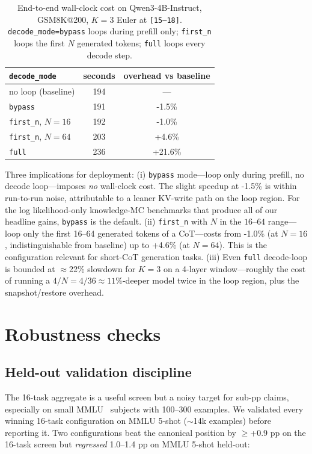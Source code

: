 \begin{table}[h]
\centering
\footnotesize
\caption{End-to-end wall-clock cost on Qwen3-4B-Instruct, GSM8K@200,
$K{=}3$ Euler at \texttt{[15--18]}. \texttt{decode\_mode=bypass} loops
during prefill only; \texttt{first\_n} loops the first $N$ generated
tokens; \texttt{full} loops every decode step.}
\label{tab:wallclock}
\setlength{\tabcolsep}{8pt}
\begin{tabular}{lcc}
\toprule
\texttt{decode\_mode} & seconds & overhead vs baseline \\
\midrule
no loop (baseline)        & 194 & ---       \\
\texttt{bypass}           & 191 & -1.5\% \\
\texttt{first\_n}, $N{=}16$ & 192 & -1.0\% \\
\texttt{first\_n}, $N{=}64$ & 203 & +4.6\% \\
\texttt{full}             & 236 & +21.6\% \\
\bottomrule
\end{tabular}
\end{table}

Three implications for deployment: (i) \texttt{bypass} mode---loop only during prefill, no decode loop---imposes \emph{no} wall-clock cost. The slight speedup at -1.5\% is within run-to-run noise, attributable to a leaner KV-write path on the loop region. For the log likelihood-only knowledge-MC benchmarks that produce all of our headline gains, \texttt{bypass} is the default. (ii) \texttt{first\_n} with $N$ in the $16$--$64$ range---loop only the first 16--64 generated tokens of a CoT---costs from -1.0\% (at $N{=}16$, indistinguishable from baseline) up to +4.6\% (at $N{=}64$). This is the configuration relevant for short-CoT generation tasks. (iii) Even \texttt{full} decode-loop is bounded at $\approx$22\% slowdown for $K{=}3$ on a 4-layer window---roughly the cost of running a $4/N{=}4/36 \approx 11\%$-deeper model twice in the loop region, plus the snapshot/restore overhead.

\section{Robustness checks}
\label{app:robustness}

\subsection{Held-out validation discipline}

The 16-task aggregate is a useful screen but a noisy target for sub-pp claims, especially on small MMLU~\citep{hendrycks2021mmlu} subjects with 100--300 examples. We validated every winning 16-task configuration on MMLU 5-shot ($\sim$14k examples) before reporting it. Two configurations beat the canonical position by $\geq$+0.9 pp on the 16-task screen but \emph{regressed} 1.0--1.4 pp on MMLU 5-shot held-out:

